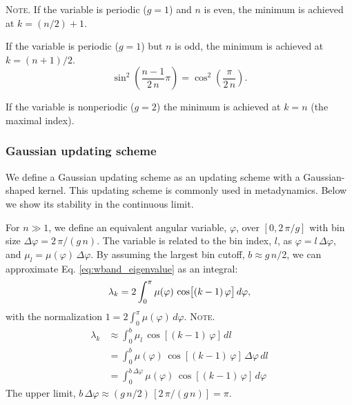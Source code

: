 \documentclass[reprint, superscriptaddress, floatfix]{revtex4-1}
\newcommand{\note}[1]{{\color{DarkGreen}\footnotesize \textsc{Note.} #1}}
\begin{document}
\note{
If the variable is periodic ($g = 1$) and $n$ is even,
the minimum is achieved at $k = (n/2) + 1$.

If the variable is periodic ($g = 1$) but $n$ is odd,
the minimum is achieved at $k = (n+1)/2$.
$$
\sin^2\left(
  \frac{n-1}{2 \, n} \pi
\right)
=
\cos^2\left(
  \frac{\pi}{2 \, n}
\right)
.
$$

If the variable is nonperiodic ($g = 2$)
the minimum is achieved at $k = n$ (the maximal index).
}





\subsubsection{Gaussian updating scheme}



We define a Gaussian updating scheme
as an updating scheme with a
Gaussian-shaped kernel.
%
This updating scheme is commonly
used in metadynamics.
%
Below we show its stability
in the continuous limit.



For $n \gg 1$,
we define an equivalent angular variable, $\varphi$,
over $[0, 2 \, \pi/g]$
with bin size
$\Delta \varphi = 2 \, \pi/(g \, n)$.
The variable is related to the bin index, $l$, as
$\varphi = l \, \Delta \varphi$,
and
$\mu_l = \mu(\varphi) \, \Delta \varphi$.
%
By assuming the largest bin cutoff, $b \approx g \, n/2$,
we can approximate Eq. \eqref{eq:wband_eigenvalue}
as an integral:
%
\begin{equation}
  \lambda_k
  =
  2 \int_0^\pi
    \mu(\varphi) \, \cos \bigl[ (k-1) \, \varphi \bigr] \, d\varphi,
\notag
\end{equation}
%
with the normalization
%
$
  1 = 2 \int_0^\pi \mu(\varphi) \, d\varphi.
$
\note{
\begin{align*}
  \lambda_k
  &\approx
  \int_0^b \mu_l \, \cos[(k-1) \, \varphi] \, dl
  \\
  &=
  \int_0^b \mu(\varphi) \, \cos[(k-1) \, \varphi] \, \Delta \varphi \, dl
  \\
  &=
  \int_0^{b \, \Delta \varphi} \mu(\varphi) \, \cos[(k-1) \, \varphi] \, d\varphi
\end{align*}
The upper limit,
$b \, \Delta \varphi \approx (g\,n/2) \, [2\,\pi/(g\,n)] = \pi$.
}
\end{document}

